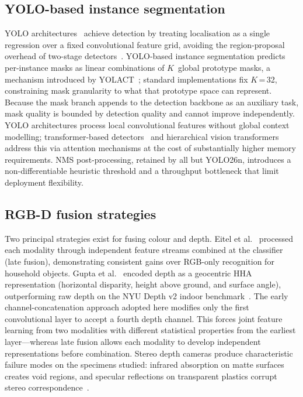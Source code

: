 \documentclass{Academic}
\begin{document}
\subsection{YOLO-based instance segmentation}
YOLO architectures~\supercite{redmon2016yolo} achieve detection by treating localisation as a single regression over a fixed convolutional feature grid, avoiding the region-proposal overhead of two-stage detectors~\supercite{ren2015fasterrcnn,he2017maskrcnn}. YOLO-based instance segmentation predicts per-instance masks as linear combinations of $K$~global prototype masks, a mechanism introduced by YOLACT~\supercite{bolya2019yolact}; standard implementations fix $K$\,=\,32, constraining mask granularity to what that prototype space can represent. Because the mask branch appends to the detection backbone as an auxiliary task, mask quality is bounded by detection quality and cannot improve independently. YOLO architectures process local convolutional features without global context modelling; transformer-based detectors~\supercite{carion2020detr} and hierarchical vision transformers~\supercite{liu2021swin} address this via attention mechanisms at the cost of substantially higher memory requirements. NMS post-processing, retained by all but YOLO26n, introduces a non-differentiable heuristic threshold and a throughput bottleneck that limit deployment flexibility.

\subsection{RGB-D fusion strategies}
Two principal strategies exist for fusing colour and depth. Eitel et al.~\supercite{eitel2015rgbd} processed each modality through independent feature streams combined at the classifier (late fusion), demonstrating consistent gains over RGB-only recognition for household objects. Gupta et al.~\supercite{gupta2014learning} encoded depth as a geocentric HHA representation (horizontal disparity, height above ground, and surface angle), outperforming raw depth on the NYU Depth v2 indoor benchmark~\supercite{silberman2012indoor}. The early channel-concatenation approach adopted here modifies only the first convolutional layer to accept a fourth depth channel. This forces joint feature learning from two modalities with different statistical properties from the earliest layer---whereas late fusion allows each modality to develop independent representations before combination. Stereo depth cameras produce characteristic failure modes on the specimens studied: infrared absorption on matte surfaces creates void regions, and specular reflections on transparent plastics corrupt stereo correspondence~\supercite{keselman2017realsense}.
\end{document}
